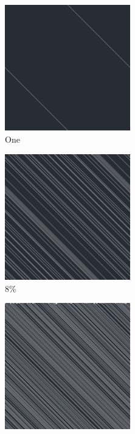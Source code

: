 \documentclass[12pt, fleqn]{report}                             %
\theoremstyle{break}                                            %
\begin{document}
      \begin{figure}[ht!]
        \centering
        \begin{subfigure}[b]{0.4\linewidth}
          \includegraphics[width=0.6\textwidth]{Images/152/a.png}
          \caption{One}
        \end{subfigure}
        \begin{subfigure}[b]{0.4\linewidth}
          \includegraphics[width=0.6\textwidth]{Images/152/b.png}
          \caption{8\%}
        \end{subfigure}
        \begin{subfigure}[b]{0.4\linewidth}
          \includegraphics[width=0.6\textwidth]{Images/152/c.png}

\end{subfigure}
\end{figure}
\end{document}
